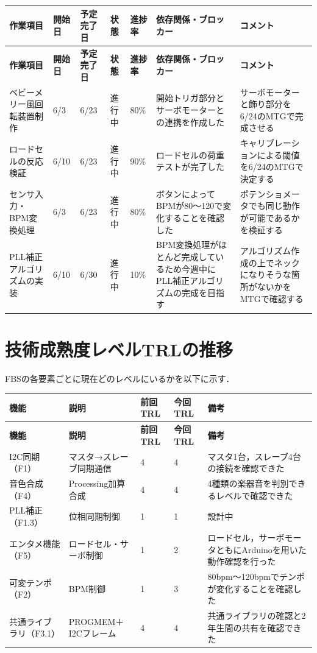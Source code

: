\documentclass[a4paper,12pt]{ltjsarticle}
\begin{document}
\begin{longtable}{C{2cm}C{1.6cm}C{1.6cm}C{2.2cm}C{1.2cm}L{2.4cm}L{3cm}}
  \toprule
  \textbf{作業項目} & \textbf{開始日} & \textbf{予定完了日} & \textbf{状態} & \textbf{進捗率} & \textbf{依存関係・ブロッカー} & \textbf{コメント} \\
  \midrule
  \endfirsthead
  \toprule
  \textbf{作業項目} & \textbf{開始日} & \textbf{予定完了日} & \textbf{状態} & \textbf{進捗率} & \textbf{依存関係・ブロッカー} & \textbf{コメント} \\
  \midrule
  \endhead
  \midrule
  \endfoot
  \bottomrule
  \endlastfoot
  ベビーメリー風回転装置制作 & 6/3 & 6/23 & 進行中 & 80\% & 開始トリガ部分とサーボモーターとの連携を作成した & サーボモーターと飾り部分を6/24のMTGで完成させる \\
  ロードセルの反応検証 & 6/10 & 6/23 & 進行中 & 90\% & ロードセルの荷重テストが完了した & キャリブレーションによる閾値を6/24のMTGで決定する \\
  センサ入力・BPM変換処理 & 6/3 & 6/23 & 進行中 & 80\% & ボタンによってBPMが80〜120で変化することを確認した & ポテンショメータでも同じ動作が可能であるかを検証する \\
  PLL補正アルゴリズムの実装 & 6/10 & 6/30 & 進行中 & 10\% & BPM変換処理がほとんど完成しているため今週中にPLL補正アルゴリズムの完成を目指す & アルゴリズム作成の上でネックになりそうな箇所がないかをMTGで確認する
\end{longtable}

\section{技術成熟度レベルTRLの推移}
FBSの各要素ごとに現在どのレベルにいるかを以下に示す．

\begin{longtable}{L{2.5cm}L{4cm}C{2cm}C{2cm}L{3.5cm}}
  \toprule
  \textbf{機能} & \textbf{説明} & \textbf{前回TRL} & \textbf{今回TRL} & \textbf{備考} \\
  \midrule
  \endfirsthead
  \toprule
  \textbf{機能} & \textbf{説明} & \textbf{前回TRL} & \textbf{今回TRL} & \textbf{備考} \\
  \midrule
  \endhead
  \midrule
  \endfoot
  \bottomrule
  \endlastfoot
  I2C同期（F1） & マスタ→スレーブ同期通信 & 4 & 4 & マスタ1台，スレーブ4台の接続を確認できた \\
  音色合成（F4） & Processing加算合成 & 4 & 4 & 4種類の楽器音を判別できるレベルで確認できた \\
  PLL補正（F1.3） & 位相同期制御 & 1 & 1 & 設計中 \\
  エンタメ機能（F5） & ロードセル・サーボ制御 & 1 & 2 & ロードセル，サーボモータともにArduinoを用いた動作確認を行った \\
  可変テンポ（F2） & BPM制御 & 1 & 3 & 80bpm〜120bpmでテンポが変化することを確認した \\
  共通ライブラリ（F3.1） & PROGMEM＋I2Cフレーム & 4 & 4 & 共通ライブラリの確認と2年生間の共有を確認できた \\
\end{longtable}
\end{document}
